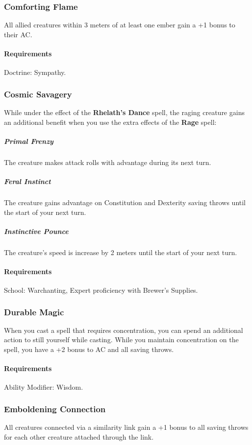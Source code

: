 \subsubsection{Comforting Flame} \label{feat::comfortingflame}
    All allied creatures within 3 meters of at least one ember gain a +1 bonus to their AC.
    \paragraph{Requirements} Doctrine: Sympathy.
\subsubsection{Cosmic Savagery} \label{feat::cosmicsavaregy}
    While under the effect of the \textbf{Rhelath's Dance} spell, the raging creature gains an additional benefit when you use the extra effects of the \textbf{Rage} spell:

    \subparagraph{Primal Frenzy}
    The creature makes attack rolls with advantage during its next turn.
    \subparagraph{Feral Instinct}
    The creature gains advantage on Constitution and Dexterity saving throws until the start of your next turn.
    \subparagraph{Instinctive Pounce}
    The creature's speed is increase by 2 meters until the start of your next turn.
    \paragraph{Requirements} School: Warchanting, Expert proficiency with Brewer's Supplies.
\subsubsection{Durable Magic} \label{feat::durablemagic}
    When you cast a spell that requires concentration, you can spend an additional action to still yourself while casting.
    While you maintain concentration on the spell, you have a +2 bonus to AC and all saving throws.
    \paragraph{Requirements} Ability Modifier: Wisdom.
\subsubsection{Emboldening Connection} \label{feat::emboldeningconnection}
    All creatures connected via a similarity link gain a +1 bonus to all saving throws for each other creature attached through the link.
